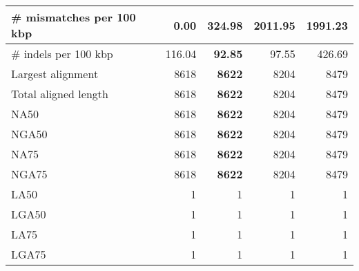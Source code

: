 \documentclass[12pt,a4paper]{article}
\begin{document}
\begin{table}[ht]
\begin{center}
\begin{tabular}{|l*{4}{|r}|}
\# mismatches per 100 kbp & {\bf 0.00} & 324.98 & 2011.95 & 1991.23 \\ \hline
\# indels per 100 kbp & 116.04 & {\bf 92.85} & 97.55 & 426.69 \\ \hline
Largest alignment & 8618 & {\bf 8622} & 8204 & 8479 \\ \hline
Total aligned length & 8618 & {\bf 8622} & 8204 & 8479 \\ \hline
NA50 & 8618 & {\bf 8622} & 8204 & 8479 \\ \hline
NGA50 & 8618 & {\bf 8622} & 8204 & 8479 \\ \hline
NA75 & 8618 & {\bf 8622} & 8204 & 8479 \\ \hline
NGA75 & 8618 & {\bf 8622} & 8204 & 8479 \\ \hline
LA50 & 1 & 1 & 1 & 1 \\ \hline
LGA50 & 1 & 1 & 1 & 1 \\ \hline
LA75 & 1 & 1 & 1 & 1 \\ \hline
LGA75 & 1 & 1 & 1 & 1 \\ \hline
\end{tabular}
\end{center}
\end{table}
\end{document}
